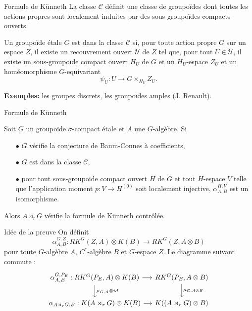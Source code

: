 \begin{frame}{Formule de Künneth}
La classe $\mathcal C$ définit une classe de groupoïdes dont toutes les actions propres sont localement induites par des sous-groupoïdes compacts ouverts. 
\vspace{0.3 cm}
\begin{definitionfr}
Un groupoïde étale $G$ est dans la classe $\mathcal C$ si, pour toute action propre $G$ sur un espace $Z$, il existe un recouvrement ouvert $\mathcal U$ de $Z$ tel que, pour tout $U\in\mathcal U$, il existe un sous-groupoïde compact ouvert $H_U$ de $G$ et un $H_U$-espace $Z_U$ et un homéomorphisme $G$-equivariant
\[\psi_U : U \rightarrow G\times_{H_U} Z_U.\] 
\end{definitionfr}
\vspace{0.3 cm}
\textbf{Exemples:} les groupes discrets, les groupoïdes amples (J. Renault).

\end{frame}


\begin{frame}{Formule de Künneth}
\begin{thmfr}
Soit $G$ un groupoïde $\sigma$-compact étale et $A$ une $G$-algèbre. Si 
\begin{itemize}
\item[$\bullet$] $G$ vérifie la conjecture de Baum-Connes à coefficients,
\item[$\bullet$] $G$ est dans la classe $\mathcal C$,
\item[$\bullet$] pour tout sous-groupoïde compact ouvert $H$ de $G$ et tout $H$-espace $V$ telle que l'application moment $p : V\rightarrow H^{(0)}$ soit localement injective, $\alpha_{A,B}^{H,V}$ est un isomorphisme.
\end{itemize} 
Alors $A\rtimes_r G$ vérifie la formule de Künneth contrôlée.
\end{thmfr}
\end{frame}

\begin{frame}{Idée de la preuve}
On définit  
\[\alpha_{A,B}^{G,Z} : RK^G(Z,A)\otimes K(B) \rightarrow RK^G(Z,A\otimes B)\]
pour toute $G$-algèbre $A$, $C^*$-algèbre $B$ et $G$-espace $Z$.
Le diagramme suivant commute :
\[\begin{tikzcd}[ampersand replacement=\&, column sep=small] 
\alpha_{A,B}^{G,P_E}: RK^G(P_E,A)\otimes K(B)\arrow{r}\arrow{d}{\mu_{G,A}\otimes id}    \& RK^G(P_E,A\otimes B)\arrow{d}{\mu_{G,A\otimes B}} \\
\alpha_{A\rtimes_r G,B}: K(A\rtimes_r G) \otimes K(B) \arrow{r} \& K((A\rtimes_r G)\otimes B)
\end{tikzcd}\]
\end{frame}

